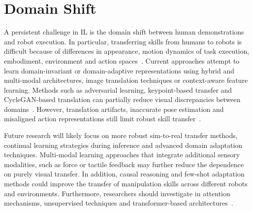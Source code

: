 
\section{Domain Shift}
A persistent challenge in \ac{IL} is the domain shift between
human demonstrations and robot execution. In particular, transferring skills from humans to robots is difficult because of differences in appearance, motion dynamics of task execution, embodiment, environment and action spaces~\cite{Eze2024LearningBW}. 
Current approaches attempt to learn domain-invariant or domain-adaptive representations using hybrid and multi-modal architectures, image translation techniques or context-aware feature learning. Methods such as adversarial learning, keypoint-based transfer and CycleGAN-based translation can partially reduce visual discrepancies between domains~\cite{Wulfmeier2017AddressingAC, Paudel2022LearningFR}. However, translation artifacts, inaccurate pose estimation and misaligned action representations still limit robust skill transfer~\cite{Eze2024LearningBW}.

Future research will likely focus on more robust sim-to-real transfer methods, continual learning strategies during inference and advanced domain adaptation techniques. Multi-modal learning approaches that integrate additional sensory modalities, such as force or tactile feedback may further reduce the dependence on purely visual transfer. In addition, causal reasoning and few-shot adaptation methods could improve the transfer of manipulation skills across different robots and environments. Furthermore, researchers should investigate in attention mechanisms, unsupervised techniques and transformer-based architectures~\cite{Eze2024LearningBW}.




